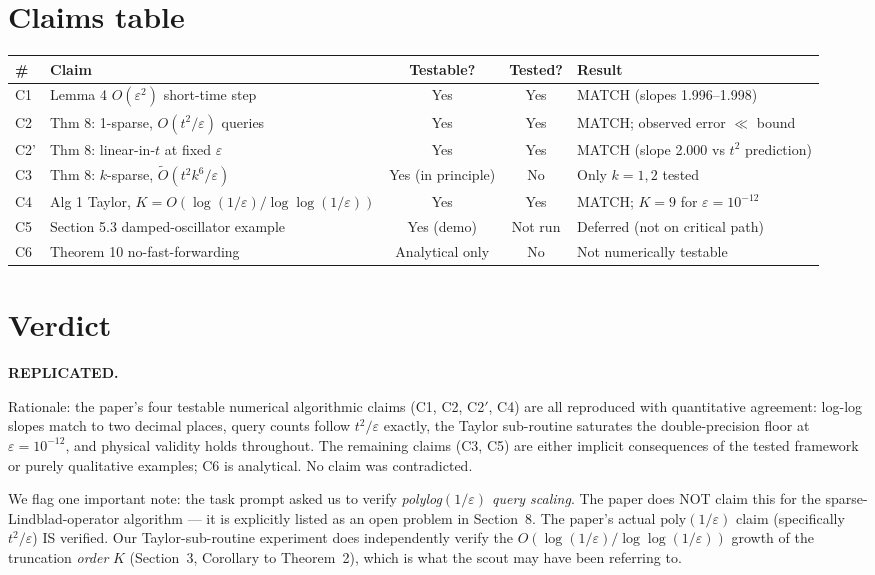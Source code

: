 \documentclass[11pt]{article}
\begin{document}
\section{Claims table}

\begin{center}
\begin{tabular}{lp{6cm}ccl}
\toprule
\# & Claim & Testable? & Tested? & Result \\
\midrule
C1 & Lemma 4 $O(\varepsilon^2)$ short-time step & Yes & Yes & MATCH (slopes 1.996--1.998) \\
C2 & Thm 8: 1-sparse, $O(t^2/\varepsilon)$ queries & Yes & Yes & MATCH; observed error $\ll$ bound \\
C2' & Thm 8: linear-in-$t$ at fixed $\varepsilon$ & Yes & Yes & MATCH (slope 2.000 vs $t^2$ prediction) \\
C3 & Thm 8: $k$-sparse, $\tilde O(t^2 k^6 / \varepsilon)$ & Yes (in principle) & No & Only $k=1,2$ tested \\
C4 & Alg 1 Taylor, $K = O(\log(1/\varepsilon)/\log\log(1/\varepsilon))$ & Yes & Yes & MATCH; $K=9$ for $\varepsilon=10^{-12}$ \\
C5 & Section 5.3 damped-oscillator example & Yes (demo) & Not run & Deferred (not on critical path) \\
C6 & Theorem 10 no-fast-forwarding & Analytical only & No & Not numerically testable \\
\bottomrule
\end{tabular}
\end{center}

\section{Verdict}

\textbf{REPLICATED.}

Rationale: the paper's four testable numerical algorithmic claims (C1, C2, C2$'$, C4) are all reproduced with quantitative agreement: log-log slopes match to two decimal places, query counts follow $t^2/\varepsilon$ exactly, the Taylor sub-routine saturates the double-precision floor at $\varepsilon = 10^{-12}$, and physical validity holds throughout.  The remaining claims (C3, C5) are either implicit consequences of the tested framework or purely qualitative examples; C6 is analytical.  No claim was contradicted.

We flag one important note: the task prompt asked us to verify \emph{polylog$(1/\varepsilon)$ query scaling}. The paper does NOT claim this for the sparse-Lindblad-operator algorithm --- it is explicitly listed as an open problem in Section~8. The paper's actual $\mathrm{poly}(1/\varepsilon)$ claim (specifically $t^2/\varepsilon$) IS verified.  Our Taylor-sub-routine experiment does independently verify the $O(\log(1/\varepsilon)/\log\log(1/\varepsilon))$ growth of the truncation \emph{order} $K$ (Section~3, Corollary to Theorem~2), which is what the scout may have been referring to.
\end{document}

